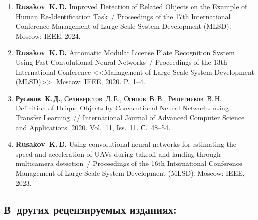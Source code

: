 \begin{enumerate}[resume]
    \item \textbf{Rusakov~K.\,D.} Improved Detection of Related Objects on the
          Example of Human Re‑Identification Task~/ Proceedings of the 17th
          International Conference Management of Large‑Scale System Development
          (MLSD). Moscow: IEEE, 2024.
    \item \textbf{Rusakov~K.\,D.} Automatic Modular License Plate Recognition
          System Using Fast Convolutional Neural Networks~/ Proceedings of the
          13th International Conference <<Management of Large‑Scale System
          Development (MLSD)>>. Moscow: IEEE, 2020. P.~1--4.
    \item \textbf{Русаков~К.\,Д.}, Селиверстов~Д.\,Е., Осипов~В.\,В.,
          Решетников~В.\,Н. Definition of Unique Objects by Convolutional Neural
          Networks using Transfer Learning~// International Journal of Advanced
          Computer Science and Applications. 2020. Vol.~11, Iss.~11. С.~48--54.
    \item \textbf{Rusakov~K.\,D.} Using convolutional neural networks for
          estimating the speed and acceleration of UAVs during takeoff and
          landing through multicamera detection~/ Proceedings of the 16th
          International Conference Management of Large‑Scale System Development
          (MLSD). Moscow: IEEE, 2023.
\end{enumerate}

\subsection*{В~других рецензируемых изданиях:}

